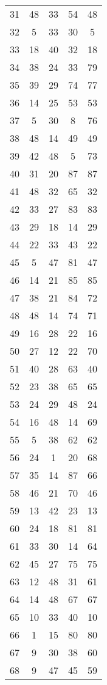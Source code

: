 \documentclass[a4paper,10pt,ngerman]{scrartcl}
\begin{document}
\begin{longtable}[c]{c|c|c|c|c}
    31 & 48 & 33 & 54 & 48 \\
    32 & 5 & 33 & 30 & 5 \\
    33 & 18 & 40 & 32 & 18 \\
    34 & 38 & 24 & 33 & 79 \\
    35 & 39 & 29 & 74 & 77 \\
    36 & 14 & 25 & 53 & 53 \\
    37 & 5 & 30 & 8 & 76 \\
    38 & 48 & 14 & 49 & 49 \\
    39 & 42 & 48 & 5 & 73 \\
    40 & 31 & 20 & 87 & 87 \\
    41 & 48 & 32 & 65 & 32 \\
    42 & 33 & 27 & 83 & 83 \\
    43 & 29 & 18 & 14 & 29 \\
    44 & 22 & 33 & 43 & 22 \\
    45 & 5 & 47 & 81 & 47 \\
    46 & 14 & 21 & 85 & 85 \\
    47 & 38 & 21 & 84 & 72 \\
    48 & 48 & 14 & 74 & 71 \\
    49 & 16 & 28 & 22 & 16 \\
    50 & 27 & 12 & 22 & 70 \\
    51 & 40 & 28 & 63 & 40 \\
    52 & 23 & 38 & 65 & 65 \\
    53 & 24 & 29 & 48 & 24 \\
    54 & 16 & 48 & 14 & 69 \\
    55 & 5 & 38 & 62 & 62 \\
    56 & 24 & 1 & 20 & 68 \\
    57 & 35 & 14 & 87 & 66 \\
    58 & 46 & 21 & 70 & 46 \\
    59 & 13 & 42 & 23 & 13 \\
    60 & 24 & 18 & 81 & 81 \\
    61 & 33 & 30 & 14 & 64 \\
    62 & 45 & 27 & 75 & 75 \\
    63 & 12 & 48 & 31 & 61 \\
    64 & 14 & 48 & 67 & 67 \\
    65 & 10 & 33 & 40 & 10 \\
    66 & 1 & 15 & 80 & 80 \\
    67 & 9 & 30 & 38 & 60 \\
    68 & 9 & 47 & 45 & 59 \\

\end{longtable}
\end{document}

